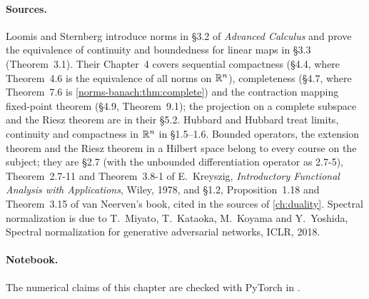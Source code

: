 \begin{notechapter}
\paragraph{Sources.} Loomis and Sternberg introduce norms in \S3.2 of
\emph{Advanced Calculus} and prove the equivalence of continuity and
boundedness for linear maps in \S3.3 (Theorem~3.1). Their Chapter~4 covers
sequential compactness (\S4.4, where Theorem~4.6 is the equivalence of all
norms on $\mathbb{R}^n$), completeness (\S4.7, where Theorem~7.6 is
\cref{norms-banach:thm:complete}) and the contraction mapping fixed-point
theorem (\S4.9, Theorem~9.1); the projection on a complete subspace and
the Riesz theorem are in their \S5.2. Hubbard and Hubbard treat limits,
continuity and compactness in $\mathbb{R}^n$ in \S1.5--1.6. Bounded operators,
the extension theorem and the Riesz theorem in a Hilbert space belong to
every course on the subject; they are \S2.7 (with the unbounded
differentiation operator as 2.7-5), Theorem~2.7-11 and Theorem~3.8-1 of
E.~Kreyszig, \emph{Introductory Functional Analysis with Applications},
Wiley, 1978, and \S1.2, Proposition~1.18 and Theorem~3.15 of van
Neerven's book, cited in the sources of \cref{ch:duality}. Spectral
normalization is
due to T.~Miyato, T.~Kataoka, M.~Koyama and Y.~Yoshida, Spectral
normalization for generative adversarial networks, ICLR, 2018.

\paragraph{Notebook.} The numerical claims of this chapter are checked
with PyTorch in .


\end{notechapter}
